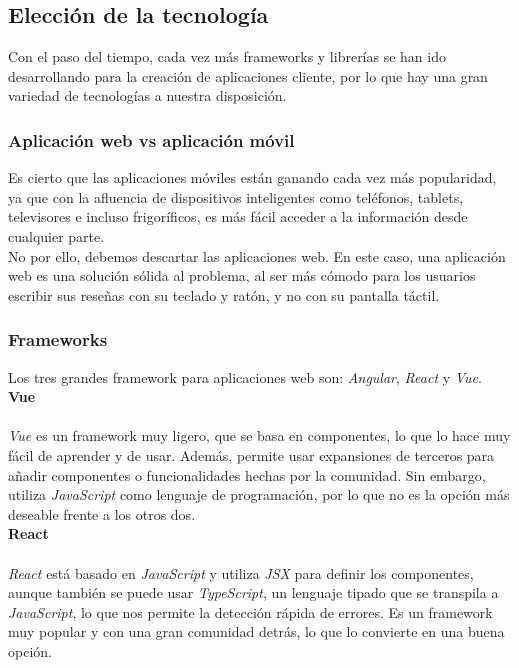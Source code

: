 \subsection{Elección de la tecnología}
Con el paso del tiempo, cada vez más frameworks y librerías se han ido desarrollando para la creación de aplicaciones
cliente, por lo que hay una gran variedad de tecnologías a nuestra disposición.\\

\subsubsection{Aplicación web vs aplicación móvil}
Es cierto que las aplicaciones móviles están ganando cada vez más popularidad, ya que con la afluencia de dispositivos
inteligentes como teléfonos, tablets, televisores e incluso frigoríficos, es más fácil acceder a la información desde
cualquier parte.\\

No por ello, debemos descartar las aplicaciones web. En este caso, una aplicación web es una solución sólida al
problema, al ser más cómodo para los usuarios escribir sus reseñas con su teclado y ratón, y no con su pantalla
táctil.\\

\subsubsection{Frameworks}
Los tres grandes framework para aplicaciones web son: \textit{Angular}\cite{angular}, \textit{React}\cite{react} y
\textit{Vue}\cite{vue}.\\

\noindent \textbf{Vue}\\ \\
\indent \textit{Vue} es un framework muy ligero, que se basa en componentes, lo que lo hace muy fácil de aprender y de usar.
Además, permite usar expansiones de terceros para añadir componentes o funcionalidades hechas por la comunidad. Sin
embargo, utiliza \textit{JavaScript}\cite{javascript} como lenguaje de programación, por lo que no es la opción más
deseable frente a los otros dos.\\

\noindent \textbf{React}\\ \\
\indent \textit{React} está basado en \textit{JavaScript} y utiliza \textit{JSX}\cite{jsx} para definir los componentes, aunque
también se puede usar \textit{TypeScript}\cite{typescript}, un lenguaje tipado que se transpila a \textit{JavaScript},
lo que nos permite la detección rápida de errores. Es un framework muy popular y con una gran comunidad detrás, lo que
lo convierte en una buena opción.\\

